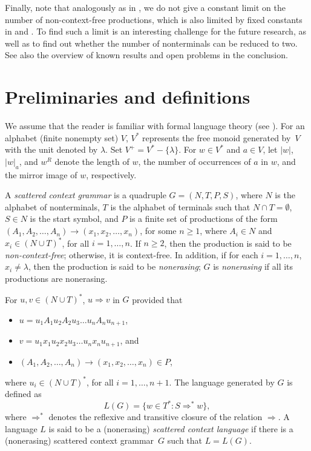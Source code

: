 \documentclass[copyright]{eptcs}
\newcommand{\Ra}{\Rightarrow}
\newcommand{\eps}{\lambda}
\begin{document}
  Finally, note that analogously as in \cite{Meduna00b}, we do not give a constant limit on the number of non-context-free productions, which is also limited by fixed constants in \cite{vaszil} and \cite{masopustTCS}. To find such a limit is an interesting challenge for the future research, as well as to find out whether the number of nonterminals can be reduced to two. See also the overview of known results and open problems in the conclusion.

\section{Preliminaries and definitions}
  We assume that the reader is familiar with formal language theory (see \cite{salomaa}).
  For an alphabet (finite nonempty set) $V$, $V^*$ represents the free monoid generated 
  by~$V$ with the unit denoted by $\eps$. Set $V^+ = V^*-\{\eps\}$. For $w \in V^*$ and $a\in V$, let $|w|$, $|w|_a$, and $w^R$ denote the length of $w$, the number of occurrences of $a$ in $w$, and the mirror image of $w$, respectively.

  A {\em scattered context grammar\/} is a quadruple $G=(N,T,P,S)$, where $N$ is the alphabet of nonterminals, $T$ is the alphabet of terminals such that $N\cap T=\emptyset$, $S\in N$ is the start symbol, and $P$ is a finite set of productions of the form $(A_1,A_2,\dots,A_n)\to (x_1,x_2,\dots,x_n)$, for some $n\geq 1$, where $A_i\in N$ and $x_i \in (N\cup T)^*$, for all $i=1,\dots,n$. If $n\ge 2$, then the production is said to be {\em non\mbox{-}context-free}; otherwise, it is context-free. In addition, if for each $i=1,\dots,n$, $x_i\neq\eps$, then the production is said to be {\em nonerasing}; $G$ is {\em nonerasing\/} if all its productions are nonerasing.

  For $u,v\in (N\cup T)^*$, $u\Ra v$ in $G$ provided that
  \begin{itemize}
    \item $u=u_1A_1u_2A_2u_3\dots u_nA_nu_{n+1}$,
    \item $v=u_1x_1u_2x_2u_3\dots u_nx_nu_{n+1}$, and
    \item $(A_1,A_2,\dots,A_n)\to (x_1,x_2,\dots,x_n)\in P$,
  \end{itemize}
  where $u_i \in (N\cup T)^*$, for all $i=1,\dots,n+1$. The language generated by $G$ is 
  defined as 
  $$L(G)=\{w \in T^* : S \Ra^* w\},$$ 
  where $\Ra^*$ denotes the reflexive and 
  transitive closure of the relation $\Ra$. A language $L$ is said to be 
  a (nonerasing) {\em scattered context language} if there is a (nonerasing) scattered 
  context grammar~$G$ such that $L=L(G)$.
\end{document}
